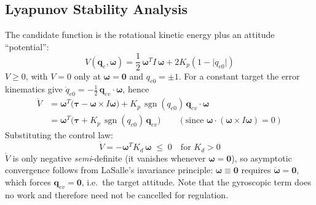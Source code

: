 \documentclass[11pt, a4paper]{article}
\newcommand{\vect}[1]{\boldsymbol{#1}}
\newcommand{\w}{\vect{\omega}}
\newcommand{\sgn}{\operatorname{sgn}}
\begin{document}
\subsection{Lyapunov Stability Analysis}
The candidate function is the rotational kinetic energy plus an attitude ``potential'':
\begin{equation}
V(\vect{q}_e, \w) = \frac{1}{2}\, \w^T I\, \w + 2 K_p \left( 1 - \lvert q_{e0} \rvert \right)
\end{equation}
$V \ge 0$, with $V = 0$ only at $\w = \vect{0}$ and $q_{e0} = \pm 1$. For a constant target the error kinematics give $\dot{q}_{e0} = -\tfrac{1}{2}\, \vect{q}_{ev} \cdot \w$, hence
\begin{align}
\dot{V} &= \w^T \big( \vect{\tau} - \w \times I\w \big) + K_p\, \sgn(q_{e0})\, \vect{q}_{ev} \cdot \w \nonumber \\
&= \w^T \big( \vect{\tau} + K_p\, \sgn(q_{e0})\, \vect{q}_{ev} \big)
\qquad (\text{since } \w \cdot (\w \times I\w) = 0)
\end{align}
Substituting the control law:
\begin{equation}
\dot{V} = -\w^T K_d\, \w \;\le\; 0 \quad \text{for } K_d > 0
\end{equation}
$\dot{V}$ is only negative \emph{semi}-definite (it vanishes whenever $\w = \vect{0}$), so asymptotic convergence follows from LaSalle's invariance principle: $\w \equiv \vect{0}$ requires $\dot{\w} = \vect{0}$, which forces $\vect{q}_{ev} = \vect{0}$, i.e.\ the target attitude. Note that the gyroscopic term does no work and therefore need not be cancelled for regulation.
\end{document}
